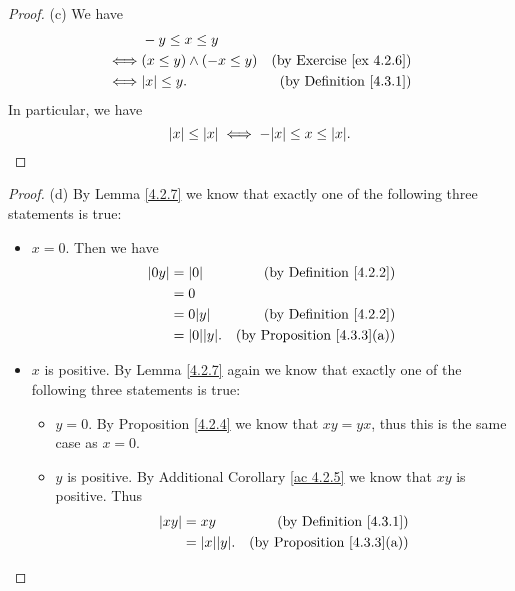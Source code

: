 \begin{proof}{(c)}
    We have
    \begin{align*}
             & -y \leq x \leq y                                                   \\
        \iff & (x \leq y) \land (-x \leq y) & \text{(by Exercise \ref{ex 4.2.6})} \\
        \iff & \abs*{x} \leq y.             & \text{(by Definition \ref{4.3.1})}
    \end{align*}
    In particular, we have
    \[
        \abs*{x} \leq \abs*{x} \iff -\abs*{x} \leq x \leq \abs*{x}.
    \]
\end{proof}

\begin{proof}{(d)}
    By Lemma \ref{4.2.7} we know that exactly one of the following three statements is true:
    \begin{itemize}
        \item \(x = 0\).
              Then we have
              \begin{align*}
                  \abs*{0y} & = \abs*{0}           & \text{(by Definition \ref{4.2.2})}     \\
                            & = 0                                                           \\
                            & = 0 \abs*{y}         & \text{(by Definition \ref{4.2.2})}     \\
                            & = \abs*{0} \abs*{y}. & \text{(by Proposition \ref{4.3.3}(a))}
              \end{align*}
        \item \(x\) is positive.
              By Lemma \ref{4.2.7} again we know that exactly one of the following three statements is true:
              \begin{itemize}
                  \item \(y = 0\).
                        By Proposition \ref{4.2.4} we know that \(xy = yx\), thus this is the same case as \(x = 0\).
                  \item \(y\) is positive.
                        By Additional Corollary \ref{ac 4.2.5} we know that \(xy\) is positive.
                        Thus
                        \begin{align*}
                            \abs*{xy} & = xy                 & \text{(by Definition \ref{4.3.1})}     \\
                                      & = \abs*{x} \abs*{y}. & \text{(by Proposition \ref{4.3.3}(a))}

\end{align*}
\end{itemize}
\end{itemize}
\end{proof}
